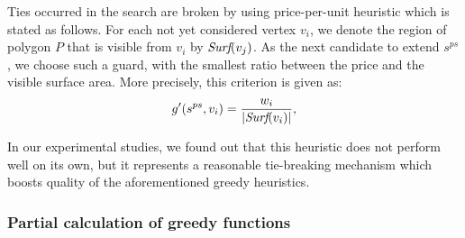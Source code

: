 \documentclass[runningheads,a4paper]{elsarticle}
\begin{document}
	
	Ties occurred in the search are broken by using  price-per-unit heuristic which is stated as follows.
	For each not yet considered vertex $v_i$, we denote the region of polygon $P$ that is visible from $v_i$ by $\emph{Surf}(v_j)$. As the next candidate to extend $s^{ps}$, we choose such a guard,  with the smallest ratio between the price and the visible surface area. More precisely, this  criterion is given as:
	\begin{align}
	g'(s^{ps}, v_i) = \frac{w_{i}}{|\emph{Surf}({v_i})|},
	\end{align}

	In our experimental studies, we found out that this heuristic does not perform well on its own, but it represents a reasonable tie-breaking mechanism which boosts quality of the aforementioned greedy heuristics.
	\subsubsection{Partial calculation of greedy functions}
	
\end{document}
